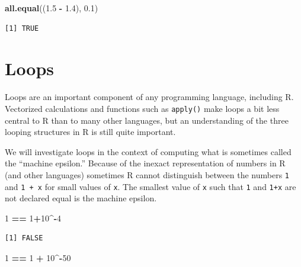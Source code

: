 \documentclass[
]{krantz}
\makeatletter
\newenvironment{Shaded}{\begin{snugshade}}{\end{snugshade}}
\newcommand{\DecValTok}[1]{\textcolor[rgb]{0.06,0.06,0.06}{#1}}
\newcommand{\FloatTok}[1]{\textcolor[rgb]{0.06,0.06,0.06}{#1}}
\newcommand{\KeywordTok}[1]{\textcolor[rgb]{0.27,0.27,0.27}{\textbf{#1}}}
\newcommand{\NormalTok}[1]{#1}
\newcommand{\OperatorTok}[1]{\textcolor[rgb]{0.43,0.43,0.43}{\textbf{#1}}}
\newcommand{\StringTok}[1]{\textcolor[rgb]{0.5,0.5,0.5}{#1}}
\newenvironment{kframe}{%
\medskip{}
\setlength{\fboxsep}{.8em}
 \def\at@end@of@kframe{}%
 \ifinner\ifhmode%
  \def\at@end@of@kframe{\end{minipage}}%
  \begin{minipage}{\columnwidth}%
 \fi\fi%
 \def\FrameCommand##1{\hskip\@totalleftmargin \hskip-\fboxsep
 \colorbox{shadecolor}{##1}\hskip-\fboxsep
     \hskip-\linewidth \hskip-\@totalleftmargin \hskip\columnwidth}%
 \MakeFramed {\advance\hsize-\width
   \@totalleftmargin\z@ \linewidth\hsize
   \@setminipage}}%
 {\par\unskip\endMakeFramed%
 \at@end@of@kframe}
\renewenvironment{Shaded}{\begin{kframe}}{\end{kframe}}
\makeatother
\begin{document}
\begin{Shaded}
\begin{Highlighting}[]
\KeywordTok{all.equal}\NormalTok{((}\FloatTok{1.5} \OperatorTok{{-}}\StringTok{ }\FloatTok{1.4}\NormalTok{), }\FloatTok{0.1}\NormalTok{)}
\end{Highlighting}
\end{Shaded}

\begin{verbatim}
[1] TRUE
\end{verbatim}

\hypertarget{loops}{%
\section{Loops}\label{loops}}

Loops are an important component of any programming language, including R. Vectorized calculations and functions such as \texttt{apply()} make loops a bit less central to R than to many other languages, but an understanding of the three looping structures in R is still quite important.

We will investigate loops in the context of computing what is sometimes called the ``machine epsilon.'' Because of the inexact representation of numbers in R (and other languages) sometimes R cannot distinguish between the numbers \texttt{1} and \texttt{\textbar{}1\ +\ x\textbar{}} for small values of \texttt{x}. The smallest value of \texttt{x} such that \texttt{1} and \texttt{\textbar{}1+x\textbar{}} are not declared equal is the machine epsilon.

\begin{Shaded}
\begin{Highlighting}[]
\DecValTok{1} \OperatorTok{==}\StringTok{ }\DecValTok{1}\OperatorTok{+}\DecValTok{10}\OperatorTok{\^{}{-}}\DecValTok{4}
\end{Highlighting}
\end{Shaded}

\begin{verbatim}
[1] FALSE
\end{verbatim}

\begin{Shaded}
\begin{Highlighting}[]
\DecValTok{1} \OperatorTok{==}\StringTok{ }\DecValTok{1} \OperatorTok{+}\StringTok{ }\DecValTok{10}\OperatorTok{\^{}{-}}\DecValTok{50}
\end{Highlighting}
\end{Shaded}
\end{document}
